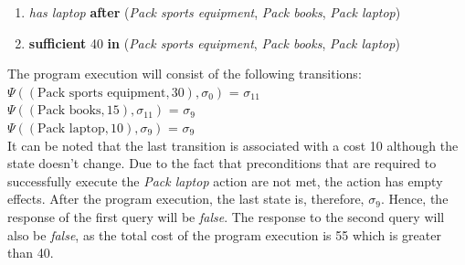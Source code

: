 \documentclass[a4paper]{article}
\begin{document}
\begin{enumerate}
    \item \textit{has laptop} \textbf{after} (\textit{Pack sports equipment}, \textit{Pack books}, \textit{Pack laptop})
    \item \textbf{sufficient} 40 \textbf{in} (\textit{Pack sports equipment}, \textit{Pack books}, \textit{Pack laptop})
\end{enumerate}
The program execution will consist of the following transitions: \\[0.5\baselineskip]
$\Psi((\text{Pack sports equipment},30),\sigma_0)$ = $\sigma_{11}$ \\[0.1\baselineskip]
$\Psi((\text{Pack books},15),\sigma_{11})$ = $\sigma_9$ \\[0.1\baselineskip]
$\Psi((\text{Pack laptop},10),\sigma_9)$ = $\sigma_9$ \\[0.5\baselineskip]
It can be noted that the last transition is associated with a cost 10 although the state doesn't change. Due to the fact that preconditions that are required to successfully execute the \emph{Pack laptop} action are not met, the action has empty effects. After the program execution, the last state is, therefore, $\sigma_9$. Hence, the response of the first query will be \textit{false}. The response to the second query will also be \textit{false}, as the total cost of the program execution is 55 which is greater than 40.
\end{document}
